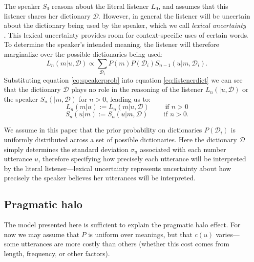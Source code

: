 \documentclass{article} %
\newcommand{\dictionary}{\ensuremath{\mathcal{D}}\xspace}
\begin{document}
The speaker $S_0$ reasons about the literal listener $L_0$, and assumes that this listener shares her dictionary $\dictionary$. However, in general the listener will be uncertain about the dictionary being used by the speaker, which we call \emph{lexical uncertainty} \cite{bergen2012}. This lexical uncertainty provides room for context-specific uses of certain words. To determine the speaker's intended meaning, the listener will therefore marginalize over the possible dictionaries being used:
\begin{equation}\label{eq:listenerdict}
L_n(m|u,\dictionary) \propto \sum_{\dictionary_i }P(m)P(\dictionary_i)S_{n-1}(u | m,\dictionary_i).
\end{equation}
Substituting equation \ref{eq:speakerprob} into equation \ref{eq:listenerdict} we can see that the dictionary $\dictionary$ plays no role in the reasoning of the listener $L_n(|u,\dictionary)$ or the speaker $S_n(| m, \dictionary)$ for $n>0$, leading us to:
\begin{equation}
  L_n(m | u) :=  L_n(m | u, \dictionary) \text{ ~~~~~ if $n > 0$}
\end{equation}
\begin{equation}
  S_n(u | m) :=  S_n(u | m, \dictionary) \text{ ~~~~~ if $n > 0$.}
\end{equation}

We assume in this paper that the prior probability on dictionaries $P(\dictionary_i)$ is uniformly distributed across a set of possible dictionaries. 
Here the dictionary $\dictionary$ simply determines the standard deviation $\sigma_u$ associated with each number utterance $u$, therefore specifying how precisely each utterance will be interpreted by the literal listener---lexical uncertainty represents uncertainty about how precisely the speaker believes her utterances will be interpreted. 


\subsection{Pragmatic halo}

The model presented here is sufficient to explain the pragmatic halo effect. For now we may assume that $P$ is uniform over meanings, but that $c(u)$ varies---some utterances are more costly than others (whether this cost comes from length, frequency, or other factors).
\end{document}
